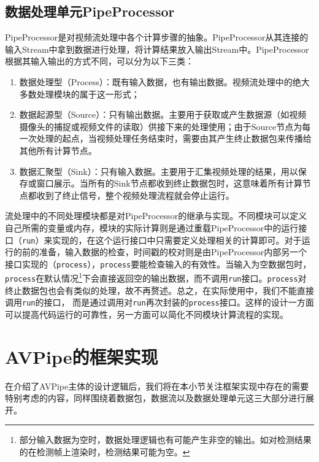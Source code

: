 \subsection{数据处理单元PipeProcessor}\label{ch4:design_proc}
PipeProcessor是对视频流处理中各个计算步骤的抽象。PipeProcessor从其连接的输入Stream中拿到数据进行处理，将计算结果放入输出Stream中。PipeProcessor根据其输入输出的方式不同，可以分为以下三类：
\begin{enumerate}
    \item 数据处理型（Process）：既有输入数据，也有输出数据。视频流处理中的绝大多数处理模块的属于这一形式；
    \item 数据起源型（Source）：只有输出数据。主要用于获取或产生数据源（如视频摄像头的捕捉或视频文件的读取）供接下来的处理使用；由于Source节点为每一次处理的起点，当视频处理任务结束时，需要由其产生终止数据包来传播给其他所有计算节点。
    \item 数据汇聚型（Sink）：只有输入数据。主要用于汇集视频处理的结果，用以保存或窗口展示。当所有的Sink节点都收到终止数据包时，这意味着所有计算节点都收到了终止信号，整个视频处理流程就会停止运行。
\end{enumerate}
流处理中的不同处理模块都是对PipeProcessor的继承与实现。不同模块可以定义自己所需的变量或内存，模块的实际计算则是通过重载PipeProcessor中的运行接口（\texttt{run}）来实现的，在这个运行接口中只需要定义处理相关的计算即可。对于运行的前的准备，输入数据的检查，时间戳的校对则是由PipeProcessor内部另一个接口实现的（\texttt{process}），\texttt{process}要能检查输入的有效性。当输入为空数据包时，\texttt{process}在默认情况\footnote{部分输入数据为空时，数据处理逻辑也有可能产生非空的输出。如对检测结果的在检测帧上渲染时，检测结果可能为空。}下会直接返回空的输出数据，而不调用\texttt{run}接口。\texttt{process}对终止数据包也会有类似的处理，故不再赘述。总之，在实际使用中，我们不能直接调用\texttt{run}的接口，
而是通过调用对\texttt{run}再次封装的\texttt{process}接口。这样的设计一方面可以提高代码运行的可靠性，另一方面可以简化不同模块计算流程的实现。

\section{AVPipe的框架实现}\label{ch4:impl}
在介绍了AVPipe主体的设计逻辑后，我们将在本小节关注框架实现中存在的需要特别考虑的内容，同样围绕着数据包，数据流以及数据处理单元这三大部分进行展开。
